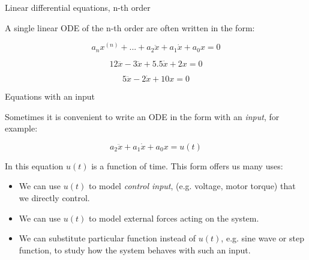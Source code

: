 \documentclass{beamer}
\begin{document}
\begin{frame}{Linear differential equations, n-th order}
\begin{flushleft}

A single linear ODE of the n-th order are often written in the form:

\begin{equation}
    a_n x^{(n)} + 
    ... +
    a_2 \ddot{x} + a_1 \dot{x} + 
    a_0 x = 0
\end{equation}

\begin{example}
\begin{equation}
12 \dddot{x} -
    3 \ddot{x} + 5.5 \dot{x} + 
    2 x = 0
\end{equation}
\end{example}

\begin{example}
\begin{equation}
    5 \ddot{x} - 2 \dot{x} + 
    10 x = 0
\end{equation}
\end{example}

\end{flushleft}
\end{frame}




\begin{frame}{Equations with an input}
	\begin{flushleft}
		
		Sometimes it is convenient to write an ODE in the form with an \emph{input}, for example:
		
		\begin{equation}
			a_2 \ddot{x} + a_1 \dot{x} + 
			a_0 x = u(t)
		\end{equation}
		
		In this equation $u(t)$ is a function of time. This form offers us many uses:
		
		\begin{itemize}
			\item We can use $u(t)$ to model \emph{control input}, (e.g. voltage, motor torque) that we directly control.
			
			\item We can use $u(t)$ to model external forces acting on the system.
			
			\item We can substitute particular function instead of $u(t)$, e.g. sine wave or step function, to study how the system behaves with such an input.
		\end{itemize}
		
	\end{flushleft}
\end{frame}
\end{document}
